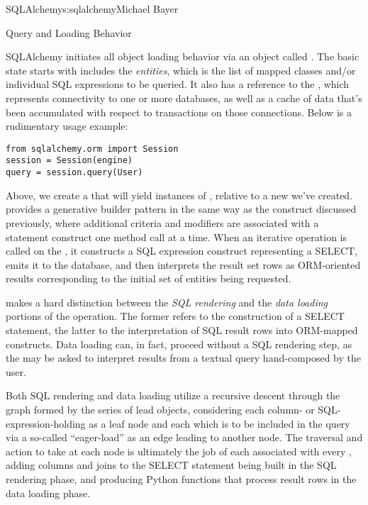\begin{aosachapter}{SQLAlchemy}{s:sqlalchemy}{Michael Bayer}
\begin{aosasect1}{Query and Loading Behavior}

SQLAlchemy initiates all object loading behavior via an object called .   The basic
state  starts with includes the \emph{entities}, which is the list of mapped classes
and/or individual SQL expressions to be queried.   It also has a reference to the
, which represents connectivity to one or
more databases, as well as a cache of data that's been accumulated with respect to
transactions on those connections.   Below is a rudimentary usage example:

\begin{verbatim}
from sqlalchemy.orm import Session
session = Session(engine)
query = session.query(User)
\end{verbatim}

Above, we create a  that will yield instances of , relative to a new
 we've created.   provides a generative builder pattern in the same
way as the  construct discussed previously, where additional criteria and
modifiers are associated with a statement construct one method call at a time.
When an iterative operation
is called on the , it constructs a SQL expression construct representing
a SELECT, emits it to the database, and then interprets the result set rows as
ORM-oriented results corresponding to the initial set of entities being requested.

 makes a hard distinction between the \emph{SQL rendering}
and the \emph{data loading} portions of the operation.  The former refers to the construction
of a SELECT statement, the latter to the interpretation of SQL result rows into
ORM-mapped constructs.   Data loading can, in fact, proceed
without a SQL rendering step, as the  may be asked to interpret results from
a textual query hand-composed by the user.

Both SQL rendering and data loading utilize a recursive descent through
the graph formed by the series of lead  objects,
considering each column- or SQL-expression-holding  as a leaf node and each
 which is to be included in the query via a so-called ``eager-load''
as an edge leading to another  node.   The traversal and action to take at each node
is ultimately the job of each  associated with every ,
adding columns and joins to the SELECT statement being built in the SQL rendering phase,
and producing Python functions that process result rows in the data loading phase.


\end{aosasect1}
\end{aosachapter}

